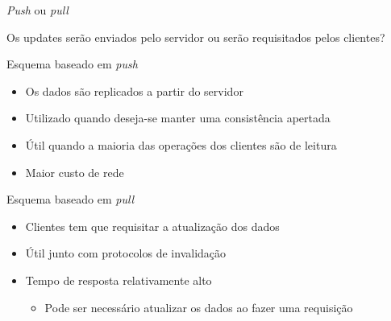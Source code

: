 \documentclass[compress]{beamer}
\begin{document}

\begin{frame}{\textit{Push} ou \textit{pull}}

Os updates serão enviados pelo servidor ou serão requisitados pelos clientes?

\vspace{0.25cm}

Esquema baseado em \textit{push}
\begin{itemize}
    \item Os dados são replicados a partir do servidor
    \item Utilizado quando deseja-se manter uma consistência apertada
    \item Útil quando a maioria das operações dos clientes são de leitura
    \item Maior custo de rede
\end{itemize}

\vspace{0.25cm}

Esquema baseado em \textit{pull}
\begin{itemize}
    \item Clientes tem que requisitar a atualização dos dados
    \item Útil junto com protocolos de invalidação
    \item Tempo de resposta relativamente alto
    \begin{itemize}
        \item Pode ser necessário atualizar os dados ao fazer uma requisição
    \end{itemize}
\end{itemize}
\end{frame}

\end{document}
